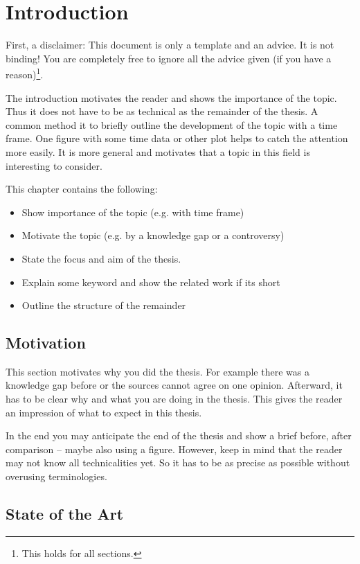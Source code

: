 \chapter{Introduction}\label{chapter:introduction}

First, a disclaimer: This document is only a template and an advice. It is not binding!
You are completely free to ignore all the advice given (if you have a reason)\footnote{This holds for all sections.}.

The introduction motivates the reader and shows the importance of the topic.
Thus it does not have to be as technical as the remainder of the thesis.
A common method it to briefly outline the development of the topic with a time frame.
One figure with some time data or other plot helps to catch the attention more easily.
It is more general and motivates that a topic in this field is interesting to consider.

This chapter contains the following:
\begin{itemize}
  \item Show importance of the topic (e.g. with time frame)
  \item Motivate the topic (e.g. by a knowledge gap or a controversy)
  \item State the focus and aim of the thesis.
  \item Explain some keyword and show the related work if its short
  \item Outline the structure of the remainder
\end{itemize}

\section{Motivation}\label{chapter:motivation}
This section motivates why you did the thesis.
For example there was a knowledge gap before or the sources cannot agree on one opinion.
Afterward, it has to be clear why and what you are doing in the thesis.
This gives the reader an impression of what to expect in this thesis.

In the end you may anticipate the end of the thesis and show a brief before, after comparison -- maybe also using a figure.
However, keep in mind that the reader may not know all technicalities yet. So it has to be as precise as possible without overusing terminologies.

\section{State of the Art}\label{chapter:stateoftheart}

